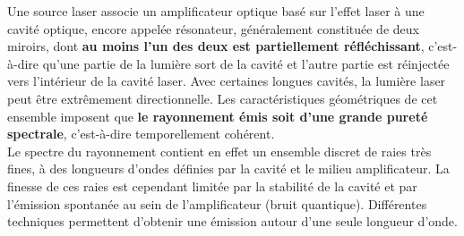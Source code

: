 \documentclass{article}
\begin{document}
Une source laser associe un amplificateur optique basé sur l'effet laser à une cavité optique, encore appelée résonateur, généralement constituée de deux miroirs, dont \textbf{au moins l'un des deux est partiellement réfléchissant}, c'est-à-dire qu'une partie de la lumière sort de la cavité et l'autre partie est réinjectée vers l'intérieur de la cavité laser. Avec certaines longues cavités, la lumière laser peut être extrêmement directionnelle. Les caractéristiques géométriques de cet ensemble imposent que \textbf{le rayonnement émis soit d'une grande pureté spectrale}, c’est-à-dire temporellement cohérent. \\
Le spectre du rayonnement contient en effet un ensemble discret de raies très fines, à des longueurs d'ondes définies par la cavité et le milieu amplificateur. La finesse de ces raies est cependant limitée par la stabilité de la cavité et par l'émission spontanée au sein de l'amplificateur (bruit quantique). Différentes techniques permettent d'obtenir une émission autour d'une seule longueur d'onde.
\end{document}
